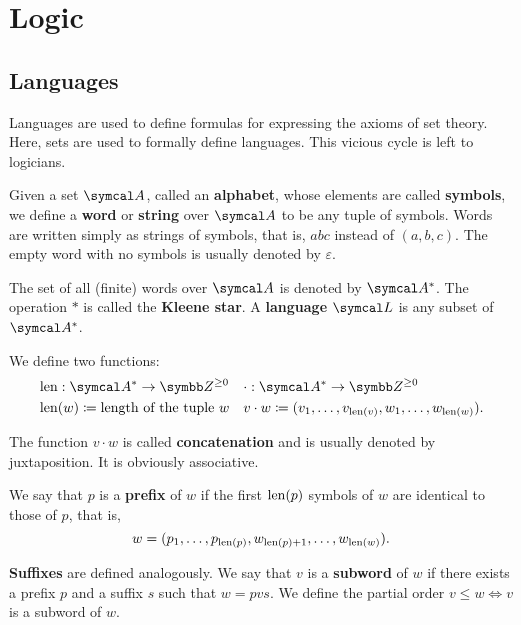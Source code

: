 \section{Logic}\label{sec:logic}
\subsection{Languages}\label{subsec:languages}

\begin{remark}\label{remark:language_definitions_using_sets}
  Languages are used to define formulas for expressing the axioms of set theory. Here, sets are used to formally define languages. This vicious cycle is left to logicians.
\end{remark}

\begin{definition}\label{def:language}
  Given a set \( \Cal{A} \), called an \textbf{alphabet}, whose elements are called \textbf{symbols}, we define a \textbf{word} or \textbf{string} over \( \Cal{A} \) to be any tuple of symbols. Words are written simply as strings of symbols, that is, \( abc \) instead of \( (a, b, c) \). The empty word with no symbols is usually denoted by \( \varepsilon \).

  The set of all (finite) words over \( \Cal{A} \) is denoted by \( \Cal{A}^{*} \). The operation \( * \) is called the \textbf{Kleene star}. A \textbf{language} \( \Cal{L} \) is any subset of \( \Cal{A}^{*} \).

  We define two functions:
  \begin{align*}
    &\Len: \Cal{A}^{*} \to \BB{Z}^{\geq 0}
    &&\cdot: \Cal{A}^{*} \to \BB{Z}^{\geq 0}
    \\
    &\Len(w) \coloneqq \text{length of the tuple } w
    &&v \cdot w \coloneqq (v_1, \ldots, v_{\Len(v)}, w_1, \ldots, w_{\Len(w)}).
  \end{align*}

  The function \( v \cdot w \) is called \textbf{concatenation} and is usually denoted by juxtaposition. It is obviously associative.

  We say that \( p \) is a \textbf{prefix} of \( w \) if the first \( \operatorname{len}(p) \) symbols of \( w \) are identical to those of \( p \), that is,
  \begin{equation*}
    w = (p_1, \ldots, p_{\operatorname{len}(p)}, w_{\operatorname{len}(p) + 1}, \ldots, w_{\operatorname{len}(w)}).
  \end{equation*}

  \textbf{Suffixes} are defined analogously. We say that \( v \) is a \textbf{subword} of \( w \) if there exists a prefix \( p \) and a suffix \( s \) such that \( w = pvs \). We define the partial order \( v \leq w \iff v \) is a subword of \( w \).


\end{definition}
